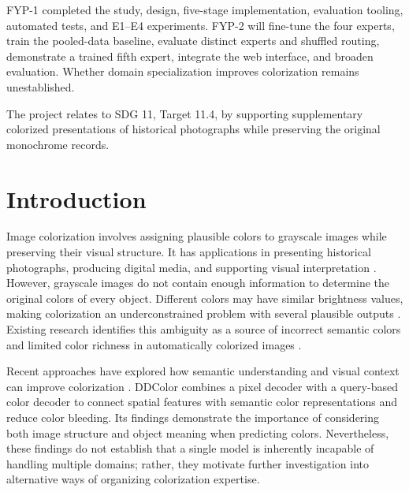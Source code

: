 \documentclass{FastFyp}
\begin{document}
FYP-1 completed the study, design, five-stage implementation, evaluation tooling, automated tests, and E1--E4 experiments. FYP-2 will fine-tune the four experts, train the pooled-data baseline, evaluate distinct experts and shuffled routing, demonstrate a trained fifth expert, integrate the web interface, and broaden evaluation. Whether domain specialization improves colorization remains unestablished.

The project relates to SDG 11, Target 11.4, by supporting supplementary colorized presentations of historical photographs while preserving the original monochrome records.
\pagebreak


\pagestyle{fancy} %
\tableofcontents

\pagebreak
\listoffigures	%
\pagebreak
\listoftables %

\mainmatter
\raggedbottom


\chapter{Introduction}
Image colorization involves assigning plausible colors to grayscale images while preserving their visual structure. It has applications in presenting historical photographs, producing digital media, and supporting visual interpretation \cite{ref21}. However, grayscale images do not contain enough information to determine the original colors of every object. Different colors may have similar brightness values, making colorization an underconstrained problem with several plausible outputs \cite{ref1,ref11}. Existing research identifies this ambiguity as a source of incorrect semantic colors and limited color richness in automatically colorized images \cite{ref1,ref9}.

Recent approaches have explored how semantic understanding and visual context can improve colorization \cite{ref2,ref9,ref11}. DDColor \cite{ref9} combines a pixel decoder with a query-based color decoder to connect spatial features with semantic color representations and reduce color bleeding. Its findings demonstrate the importance of considering both image structure and object meaning when predicting colors. Nevertheless, these findings do not establish that a single model is inherently incapable of handling multiple domains; rather, they motivate further investigation into alternative ways of organizing colorization expertise.
\end{document}

